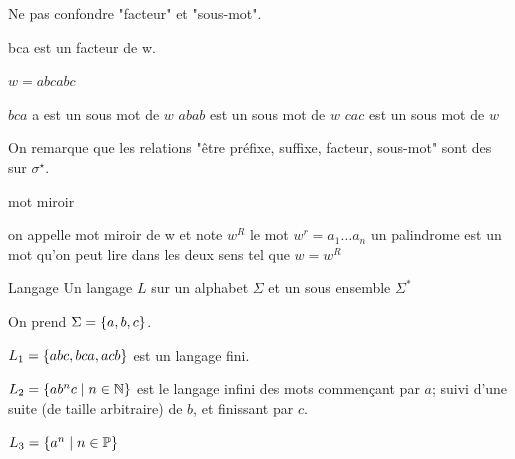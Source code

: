 \documentclass[a4paper,french,bookmarks]{book}
\begin{document}
    \begin{warning}{}{}
        Ne pas confondre "facteur" et "sous-mot".
        \begin{enumerate}
            \itt bca est un facteur de w.
        \end{enumerate}
    \end{warning}
    
    \begin{example}{}{}
        $w=abcabc$
        \begin{enumerate}
            \itt $bca$ a est un sous mot de $w$
            \itt $abab$ est un sous mot de $w$
            \itt $cac$ est un sous mot de $w$
            
            
        \end{enumerate}
        
        On remarque que les relations "être préfixe, suffixe, facteur, sous-mot" sont des  sur $\sigma^\star$.
        
    \end{example}
    \begin{definition}{mot miroir}{}
        \begin{enumerate}
            \itt on appelle mot miroir de w et note $w^R$
        le mot $w^r =  a_1 \dots a_n$
            \itt un palindrome est un mot qu'on peut lire dans les deux sens tel que $w=w^R$
            
            
            
        \end{enumerate}
        
    \end{definition}
    
    \begin{definition}{Langage}{}
        Un langage $L$ sur un alphabet $\Sigma$ et un sous ensemble $\Sigma^*$ 
    \end{definition}
    
    \begin{example}{}{}
        On prend $\Sigma = \left\{a, b, c\right\}$.
        \begin{enumerate}
            \itt $L_1 = \left\{abc, bca, acb\right\}$ est un langage fini.
            
            \itt $L_2 = \left\{ab^nc \;\middle\vert\; n \in \mathbb{N}\right\}$ est le langage infini des mots commençant par $a$; suivi d'une suite (de taille arbitraire) de $b$, et finissant par $c$.
            
            \itt $L_3 = \left\{a^n \;\middle\vert\; n \in \mathbb{P}\right\}$
        \end{enumerate}
    \end{example}
    
\end{document}
